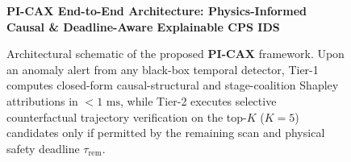 \documentclass[10pt,a4paper]{article}
\begin{document}
\begin{figure}[ht!]
\centering
\colorbox{lightbg}{%
\begin{minipage}{\dimexpr\textwidth-2\fboxsep\relax}
\vspace{4pt}
\centering
\textbf{\small\color{primary}PI-CAX End-to-End Architecture: Physics-Informed Causal \& Deadline-Aware Explainable CPS IDS}\\[4pt]
\vspace{4pt}
\end{minipage}%
}
\caption{Architectural schematic of the proposed \textbf{PI-CAX} framework. Upon an anomaly alert from any black-box temporal detector, Tier-1 computes closed-form causal-structural and stage-coalition Shapley attributions in $<1\text{ ms}$, while Tier-2 executes selective counterfactual trajectory verification on the top-$K$ ($K=5$) candidates only if permitted by the remaining scan and physical safety deadline $\tau_{\text{rem}}$.}
\label{fig:architecture}
\end{figure}
\end{document}
